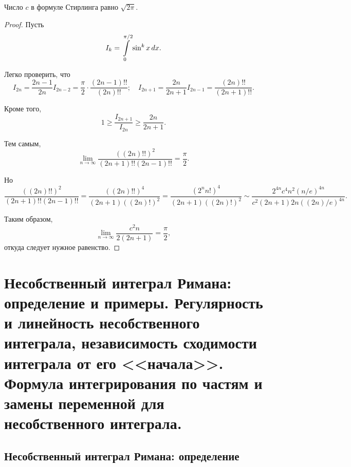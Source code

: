\documentclass[a4paper]{article}
\theoremstyle{named}
\renewcommand{\int}{\intop}
\begin{document}
   		\begin{theorem*}
   			Число $c$ в формуле Стирлинга равно $\sqrt{2\pi}$.
   		\end{theorem*}

   		\begin{proof}
   			Пусть
   			\begin{equation*}
   				I_k = \int_0^{\pi/2} \sin^k x \dd x.
   			\end{equation*}

   			Легко проверить, что
   			\begin{equation*}
   				I_{2n} = \dfrac{2n - 1}{2n}I_{2n - 2} = \dfrac{\pi}{2} \cdot \dfrac{(2n - 1)!!}{(2n)!!};
   				\quad
   				I_{2n + 1} = \dfrac{2n}{2n + 1}I_{2n - 1} = \dfrac{(2n)!!}{(2n + 1)!!}.
   			\end{equation*}

   			Кроме того,
   			\begin{equation*}
   				1 \geq \dfrac{I_{2n + 1}}{I_{2n}} \geq \dfrac{2n}{2n + 1}.
   			\end{equation*}

   			Тем самым,
   			\begin{equation*}
   				\lim_{n \to \infty} \dfrac{((2n)!!)^2}{(2n + 1)!!(2n - 1)!!} = \dfrac{\pi}{2}.
   			\end{equation*}

   			Но
   			\begin{equation*}
   				\dfrac{((2n)!!)^2}{(2n + 1)!!(2n - 1)!!} = \dfrac{((2n)!!)^4}{(2n + 1)((2n)!)^2} = \dfrac{(2^n n!)^4}{(2n + 1)((2n)!)^2} \sim \dfrac{2^{4n}c^4n^2(n / e)^{4n}}{c^2(2n + 1)2n((2n)/e)^{4n}}.
   			\end{equation*}

   			Таким образом,
   			\begin{equation*}
   				\lim_{n \to \infty} \dfrac{c^2n}{2(2n + 1)} = \dfrac{\pi}{2},
   			\end{equation*}
   			откуда следует нужное равенство.
   		\end{proof}

    \section{Несобственный интеграл Римана: определение и примеры. Регулярность и линейность несобственного интеграла, независимость сходимости интеграла от его <<начала>>. Формула интегрирования по частям и замены переменной для несобственного интеграла.}

    	\subsection{Несобственный интеграл Римана: определение}
\end{document}
